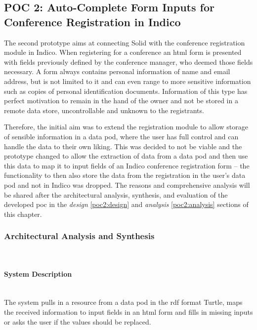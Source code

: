 \subsection{POC 2: Auto-Complete Form Inputs for Conference Registration in Indico}

The second prototype aims at connecting Solid with the conference registration module in Indico. When registering for a conference an \gls{html} form is presented with fields previously defined by the conference manager, who deemed those fields necessary. A form always contains personal information of name and email address, but is not limited to it and can even range to more sensitive information such as copies of personal identification documents. Information of this type has perfect motivation to remain in the hand of the owner and not be stored in a remote data store, uncontrollable and unknown to the registrants.

Therefore, the initial aim was to extend the registration module to allow storage of sensible information in a data pod, where the user has full control and can handle the data to their own liking. This was decided to not be viable and the prototype changed to allow the extraction of data from a data pod and then use this data to map it to input fields of an Indico conference registration form -- the functionality to then also store the data from the registration in the user's data pod and not in Indico was dropped. The reasons and comprehensive analysis will be shared after the architectural analysis, synthesis, and evaluation of the developed \gls{poc} in the \textit{design} \ref{poc2:design} and \textit{analysis} \ref{poc2:analysis} sections of this chapter.

\subsubsection{Architectural Analysis and Synthesis}\mbox{}\\

\paragraph{System Description}\mbox{}\\

The system pulls in a resource from a data pod in the \gls{rdf} format Turtle, maps the received information to input fields in an \gls{html} form and fills in missing inputs or asks the user if the values should be replaced.

